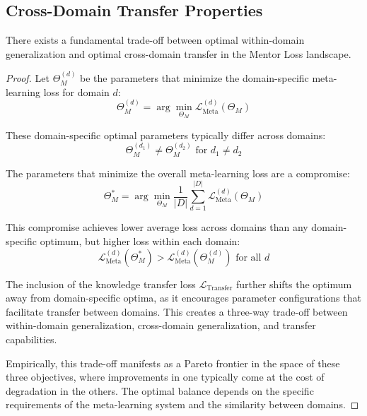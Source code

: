 \subsection{Cross-Domain Transfer Properties}

\begin{theorem}
There exists a fundamental trade-off between optimal within-domain generalization and optimal cross-domain transfer in the Mentor Loss landscape.
\end{theorem}

\begin{proof}
Let $\Theta_M^{(d)}$ be the parameters that minimize the domain-specific meta-learning loss for domain $d$:
\begin{equation}
\Theta_M^{(d)} = \arg\min_{\Theta_M} \mathcal{L}_{\text{Meta}}^{(d)}(\Theta_M)
\end{equation}

These domain-specific optimal parameters typically differ across domains:
\begin{equation}
\Theta_M^{(d_1)} \neq \Theta_M^{(d_2)} \text{ for } d_1 \neq d_2
\end{equation}

The parameters that minimize the overall meta-learning loss are a compromise:
\begin{equation}
\Theta_M^* = \arg\min_{\Theta_M} \frac{1}{|D|}\sum_{d=1}^{|D|} \mathcal{L}_{\text{Meta}}^{(d)}(\Theta_M)
\end{equation}

This compromise achieves lower average loss across domains than any domain-specific optimum, but higher loss within each domain:
\begin{equation}
\mathcal{L}_{\text{Meta}}^{(d)}(\Theta_M^*) > \mathcal{L}_{\text{Meta}}^{(d)}(\Theta_M^{(d)}) \text{ for all } d
\end{equation}

The inclusion of the knowledge transfer loss $\mathcal{L}_{\text{Transfer}}$ further shifts the optimum away from domain-specific optima, as it encourages parameter configurations that facilitate transfer between domains. This creates a three-way trade-off between within-domain generalization, cross-domain generalization, and transfer capabilities.

Empirically, this trade-off manifests as a Pareto frontier in the space of these three objectives, where improvements in one typically come at the cost of degradation in the others. The optimal balance depends on the specific requirements of the meta-learning system and the similarity between domains.
\end{proof}

